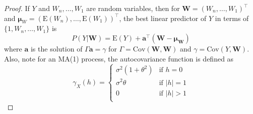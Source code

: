 \documentclass[12pt]{article}
\theoremstyle{definition}
\newcommand{\E}{\text{E}}
\newcommand{\Co}[2]{\text{Cov}\left({#1}, {#2}\right)}
\newcommand{\vect}[1]{\boldsymbol{#1}}
\begin{document}
\begin{proof}
  If $Y$ and $W_n, \dots, W_1$ are random variables, then for $\vect{W} = (W_n, \dots, W_1)^\intercal$
  and $\vect{\mu}_W= \left(\E(W_n), \dots, \E(W_1)\right)^\intercal$, the best linear
  predictor of $Y$ in terms of $\{1, W_n, \dots, W_1\}$ is
  \[
    P(Y|\vect{W}) = \E(Y) + \vect{a}^\intercal (\vect{W} - \vect{\mu_W})
  \]
  where $\vect{a}$ is the solution of $\Gamma \vect{a} = \gamma$ for
  $\Gamma = \Co{\vect{W}}{\vect{W}}$ and $\gamma = \Co{Y}{\vect{W}}$.
  Also, note for an MA(1) process, the autocovariance function is defined as
  \[
    \gamma_X(h) =
    \begin{cases}
      \sigma^2 (1 + \theta^2) & \text{if $h = 0$}\\
      \sigma^2 \theta & \text{if $|h| = 1$}\\
      0 & \text{if $|h| > 1$}\\
    \end{cases}
  \]


\end{proof}
\end{document}
